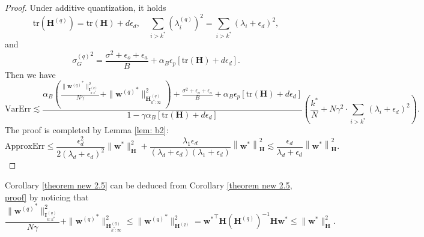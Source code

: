 \documentclass[11pt, letterpaper]{article}
\begin{document}
\begin{proof}
    Under additive quantization, it holds
    \begin{equation*}
        \mathrm{tr}(\mathbf{H}^{(q)}) = \mathrm{tr}(\mathbf{H})+d\epsilon_d,\quad \sum_{i>k^*}(\lambda_i^{(q)})^2=\sum_{i>k^*}(\lambda_i+\epsilon_d)^2,
    \end{equation*}
    and
    \begin{equation*}
        {\sigma_G^{(q)}}^2=\frac{\sigma^2+\epsilon_o+\epsilon_a}{B}+\alpha_B \epsilon_p[\mathrm{tr}(\mathbf{H})+d\epsilon_d].
    \end{equation*}
    Then we have
    \begin{equation*}
        \mathrm{VarErr}\lesssim \frac{\alpha_B\left(\frac{\|{\mathbf{w}^{(q)}}^*\|_{\mathbf{I}_{0:k^*}^{(q)}}^2}{N\gamma}+\|{\mathbf{w}^{(q)}}^*\|_{\mathbf{H}_{k^*:\infty}^{(q)}}^2\right)+\frac{\sigma^2+\epsilon_o+\epsilon_a}{B}+\alpha_B \epsilon_p[\mathrm{tr}(\mathbf{H})+d\epsilon_d]}{1-\gamma\alpha_B[\mathrm{tr}(\mathbf{H})+d\epsilon_d]}\left(\frac{k^*}{N}+N\gamma^2\cdot\sum_{i>k^*}(\lambda_i+\epsilon_d)^2\right).
    \end{equation*}
    The proof is completed by Lemma \ref{lem: b2}:
    \begin{equation*}
        \mathrm{ApproxErr}\leq \frac{\epsilon_d^2}{2(\lambda_d+\epsilon_d)^2}\|\mathbf{w}^*\|_\mathbf{H}^2+\frac{\lambda_1\epsilon_d}{(\lambda_d+\epsilon_d)(\lambda_1+\epsilon_d)}\left\|\mathbf{w}^*\right\|_\mathbf{H}^2\lesssim \frac{\epsilon_d}{\lambda_d+\epsilon_d}\left\|\mathbf{w}^*\right\|_\mathbf{H}^2.
    \end{equation*}
\end{proof}
Corollary \ref{theorem new 2.5} can be deduced from Corollary \ref{theorem new 2.5, proof} by noticing that
    \begin{equation*}
        \frac{\|{\mathbf{w}^{(q)}}^*\|_{\mathbf{I}_{0:k^*}^{(q)}}^2}{N\gamma}+\|{\mathbf{w}^{(q)}}^*\|_{\mathbf{H}_{k^*:\infty}^{(q)}}^2\leq \|{\mathbf{w}^{(q)}}^*\|_{\mathbf{H}^{(q)}}^2={\mathbf{w}^*}^\top\mathbf{H}(\mathbf{H}^{(q)})^{-1}\mathbf{H}\mathbf{w}^*\leq\|\mathbf{w}^*\|_\mathbf{H}^2.
    \end{equation*}
\end{document}
